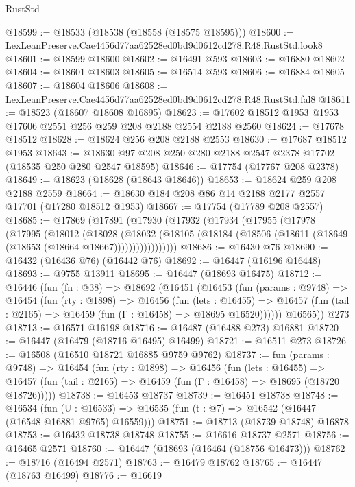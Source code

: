 \begin{lexlean}{RustStd}
\begin{coremodule}
@18599 := @18533 (@18538 (@18558 (@18575 @18595)))
@18600 := LexLeanPreserve.Cae4456d77aa62528ed0bd9d0612cd278.R48.RustStd.look8
@18601 := @18599 @18600
@18602 := @16491 @593
@18603 := @16880 @18602
@18604 := @18601 @18603
@18605 := @16514 @593
@18606 := @16884 @18605
@18607 := @18604 @18606
@18608 := LexLeanPreserve.Cae4456d77aa62528ed0bd9d0612cd278.R48.RustStd.fal8
@18611 := @18523 (@18607 @18608 @16895)
@18623 := @17602 @18512 @1953 @1953 @17606 @2551 @256 @259 @208 @2188 @2554 @2188 @2560
@18624 := @17678 @18512
@18628 := @18624 @256 @208 @2188 @2553
@18630 := @17687 @18512 @1953
@18643 := @18630 @97 @208 @250 @280 @2188 @2547 @2378 @17702 (@18535 @250 @280 @2547 @18595)
@18646 := @17754 (@17767 @208 @2378)
@18649 := @18623 (@18628 (@18643 @18646))
@18653 := @18624 @259 @208 @2188 @2559
@18664 := @18630 @184 @208 @86 @14 @2188 @2177 @2557 @17701 (@17280 @18512 @1953)
@18667 := @17754 (@17789 @208 @2557)
@18685 := @17869
    (@17891
      (@17930
        (@17932
          (@17934
            (@17955
              (@17978
                (@17995
                  (@18012
                    (@18028
                      (@18032
                        (@18105
                          (@18184 (@18506 (@18611 (@18649 (@18653 (@18664 @18667)))))))))))))))))
@18686 := @16430 @76
@18690 := @16432 (@16436 @76) (@16442 @76)
@18692 := @16447 (@16196 @16448)
@18693 := @9755 @13911
@18695 := @16447 (@18693 @16475)
@18712 := @16446
    (fun (fn : @38) =>
    @18692
      (@16451
        (@16453
          (fun (params : @9748) =>
          @16454
            (fun (rty : @1898) =>
            @16456
              (fun (lets : @16455) =>
              @16457 (fun (tail : @2165) => @16459 (fun (Γ : @16458) => @18695 @16520))))))
        @16565))
    @273
@18713 := @16571 @16198
@18716 := @16487 (@16488 @273) @16881
@18720 := @16447 (@16479 (@18716 @16495) @16499)
@18721 := @16511 @273
@18726 := @16508 (@16510 @18721 @16885 @9759 @9762)
@18737 := fun (params : @9748) =>
  @16454
    (fun (rty : @1898) =>
    @16456
      (fun (lets : @16455) =>
      @16457 (fun (tail : @2165) => @16459 (fun (Γ : @16458) => @18695 (@18720 @18726)))))
@18738 := @16453 @18737
@18739 := @16451 @18738
@18748 := @16534
    (fun (U : @16533) => @16535 (fun (t : @7) => @16542 (@16447 (@16548 @16881 @9765) @16559)))
@18751 := @18713 (@18739 @18748) @16878
@18753 := @16432 @18738 @18748
@18755 := @16616 @18737 @2571
@18756 := @16465 @2571
@18760 := @16447 (@18693 (@16464 (@18756 @16473)))
@18762 := @18716 (@16494 @2571)
@18763 := @16479 @18762
@18765 := @16447 (@18763 @16499)
@18776 := @16619

\end{coremodule}
\end{lexlean}

